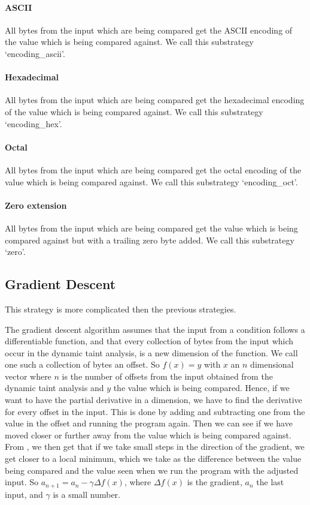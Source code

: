 \paragraph{ASCII}
All bytes from the input which are being compared get the ASCII encoding of the value which is being compared against.
We call this substrategy `encoding\_ascii'.
\paragraph{Hexadecimal}
All bytes from the input which are being compared get the hexadecimal encoding of the value which is being compared against.
We call this substrategy `encoding\_hex'.
\paragraph{Octal}
All bytes from the input which are being compared get the octal encoding of the value which is being compared against.
We call this substrategy `encoding\_oct'.
\paragraph{Zero extension}
All bytes from the input which are being compared get the value which is being compared against but with a trailing zero byte added.
We call this substrategy `zero'.


\subsection{Gradient Descent}
This strategy is more complicated then the previous strategies.

The gradient descent algorithm \cite{ruder2016overview} assumes that the input from a condition follows a differentiable function, and that every collection of bytes from the input which occur in the dynamic taint analysis, is a new dimension of the function. We call one such a collection of bytes an offset. So $f(x) = y$ with $x$ an $n$ dimensional vector where $n$ is the number of offsets from the input obtained from the dynamic taint analysis and $y$ the value which is being compared. Hence, if we want to have the partial derivative in a dimension, we have to find the derivative for every offset in the input. This is done by adding and subtracting one from the value in the offset and running the program again. Then we can see if we have moved closer or further away from the value which is being compared against. From \cite{ruder2016overview}, we then get that if we take small steps in the direction of the gradient, we get closer to a local minimum, which we take as the difference between the value being compared and the value seen when we run the program with the adjusted input. So $a_{n+1} = a_n - \gamma \Delta f(x)$, where $\Delta f(x)$ is the gradient, $a_n$ the last input, and $\gamma$ is a small number.

